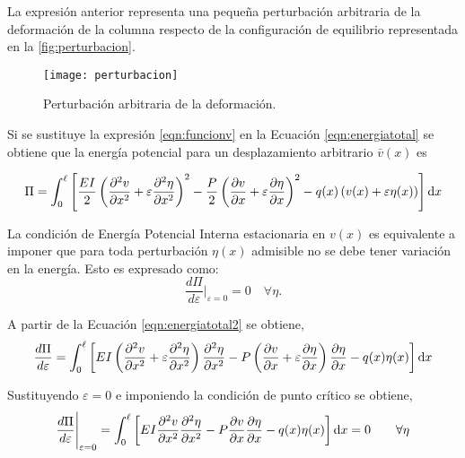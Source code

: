 La expresión anterior representa una pequeña perturbación arbitraria de la deformación de la columna respecto de la configuración de equilibrio representada en la \autoref{fig:perturbacion}.
%
\begin{figure}[htb]
	\centering
	\texttt{[image: perturbacion]}
	\caption{Perturbación arbitraria de la deformación.}
	\label{fig:perturbacion}
\end{figure}

Si se sustituye la expresión \eqref{eqn:funcionv} en la Ecuación \eqref{eqn:energiatotal} se obtiene que la energía potencial para un desplazamiento arbitrario $\bar{v}(x)$ es

\begin{equation}\label{eqn:energiatotal2}
\Pi = \int_0^\ell \left[ \frac{EI}{2} \left( \frac{\partial^2 v}{\partial x^2} + \varepsilon\frac{\partial^2 \eta}{\partial x^2} \right)^2 - \frac{P}{2} \left(\frac{\partial v}{\partial x} + \varepsilon\frac{\partial \eta}{\partial x}\right)^2- q(x) \left( v(x)+\varepsilon\eta(x)\right) \right] {\text{d}} x
\end{equation}

La condición de Energía Potencial Interna estacionaria en $v(x)$ es equivalente a imponer que para toda perturbación $\eta(x)$ admisible no se debe tener variación en la energía. Esto es expresado como:
%
\begin{equation}
\frac{d\Pi}{d\varepsilon} \Bigg|_{\varepsilon=0} = 0 \quad \forall \eta .
\end{equation}

A partir de la Ecuación \eqref{eqn:energiatotal2} se obtiene,
\begin{equation}
\frac{d\Pi}{d\varepsilon} = \int_0^\ell \left[ EI \left( \frac{\partial^2 v}{\partial x^2} + \varepsilon\frac{\partial^2 \eta}{\partial x^2} \right) \frac{\partial^2 \eta}{\partial x^2} - P \left(\frac{\partial v}{\partial x} + \varepsilon\frac{\partial \eta}{\partial x}\right)\frac{\partial \eta}{\partial x}- q(x) \eta(x) \right] {\text{d}} x
\end{equation}

Sustituyendo $\varepsilon=0$ e imponiendo la condición de punto crítico se obtiene,
%
\begin{equation}\label{eqn:difenergia}
\frac{d\Pi}{d\varepsilon} \Bigg|_{\varepsilon=0} = \int_0^\ell \left[ EI \frac{\partial^2 v}{\partial x^2} \frac{\partial^2 \eta}{\partial x^2} - P \frac{\partial v}{\partial x}\frac{\partial \eta}{\partial x}- q(x) \eta(x) \right] {\text{d}} x = 0 \qquad \forall \eta
\end{equation}

